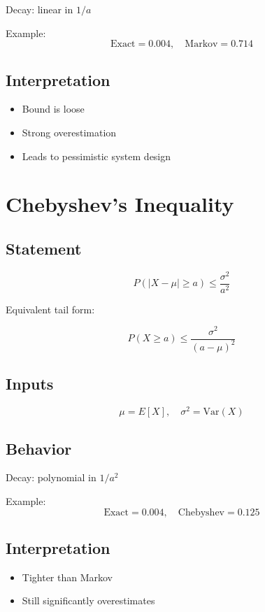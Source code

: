 \documentclass[11pt]{article}
\begin{document}
Decay: linear in $1/a$

Example:
\[
\text{Exact} = 0.004,\quad \text{Markov} = 0.714
\]

\subsection{Interpretation}

\begin{itemize}[noitemsep]
\item Bound is loose
\item Strong overestimation
\item Leads to pessimistic system design
\end{itemize}

\section{Chebyshev’s Inequality}

\subsection{Statement}

\[
P(|X - \mu| \ge a) \le \frac{\sigma^2}{a^2}
\]

Equivalent tail form:

\[
P(X \ge a) \le \frac{\sigma^2}{(a - \mu)^2}
\]

\subsection{Inputs}

\[
\mu = E[X], \quad \sigma^2 = \text{Var}(X)
\]

\subsection{Behavior}

Decay: polynomial in $1/a^2$

Example:
\[
\text{Exact} = 0.004,\quad \text{Chebyshev} = 0.125
\]

\subsection{Interpretation}

\begin{itemize}[noitemsep]
\item Tighter than Markov
\item Still significantly overestimates
\end{itemize}
\end{document}
